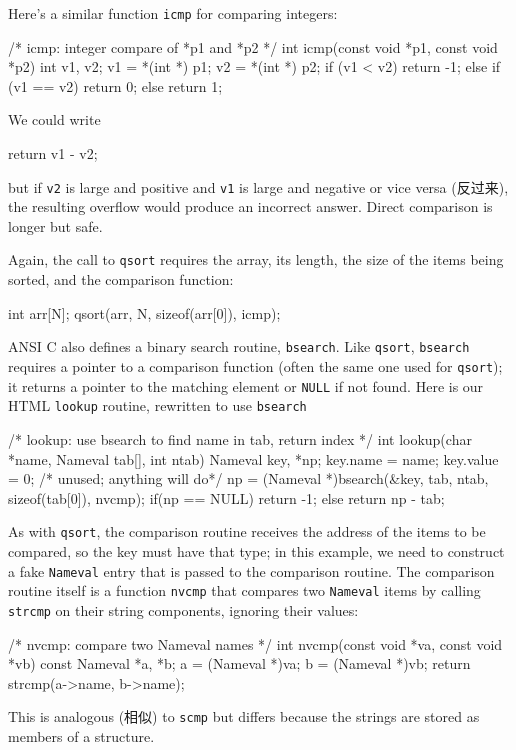 Here's a similar function \verb'icmp' for comparing integers:
\begin{wellcode}
    /* icmp: integer compare of *p1 and *p2 */
    int icmp(const void *p1, const void *p2)
    {
        int v1, v2;
        v1 = *(int *) p1;
        v2 = *(int *) p2;
        if (v1 < v2)
            return -1;
        else if (v1 == v2)
            return 0;
        else
            return 1;
    }
\end{wellcode}
We could write
\begin{badcode}
    return v1 - v2;
\end{badcode}
but if \verb'v2' is large and positive and \verb'v1' is large and negative
or vice versa (反过来), the resulting overflow would produce an incorrect
answer. Direct comparison is longer but safe.

Again, the call to \verb'qsort' requires the array, its length, the size of
the items being sorted, and the comparison function:
\begin{wellcode}
    int arr[N];
    qsort(arr, N, sizeof(arr[0]), icmp);
\end{wellcode}

ANSI C also defines a binary search routine, \verb'bsearch'. Like
\verb'qsort', \verb'bsearch' requires a pointer to a comparison function
(often the same one used for \verb'qsort'); it returns a pointer to the
matching element or \verb'NULL' if not found. Here is our HTML
\verb'lookup' routine, rewritten to use \verb'bsearch'
\begin{wellcode}
    /* lookup: use bsearch to find name in tab, return index */
    int lookup(char *name, Nameval tab[], int ntab)
    {
        Nameval key, *np;
        key.name = name;
        key.value = 0;  /* unused; anything will do*/
        np = (Nameval *)bsearch(&key, tab, ntab, sizeof(tab[0]), nvcmp);
        if(np == NULL)
            return -1;
        else
            return np - tab;
    }
\end{wellcode}

As with \verb'qsort', the comparison routine receives the address of the
items to be compared, so the key must have that type; in this example, we
need to construct a fake \verb'Nameval' entry that is passed to the
comparison routine. The comparison routine itself is a function
\verb'nvcmp' that compares two \verb'Nameval' items by calling
\verb'strcmp' on their string components, ignoring their values:
\begin{wellcode}
    /* nvcmp: compare two Nameval names */
    int nvcmp(const void *va, const void *vb)
    {
        const Nameval *a, *b;
        a = (Nameval *)va;
        b = (Nameval *)vb;
        return strcmp(a->name, b->name);
    }
\end{wellcode}
This is analogous (相似) to \verb'scmp' but differs because the strings are
stored as members of a structure.


